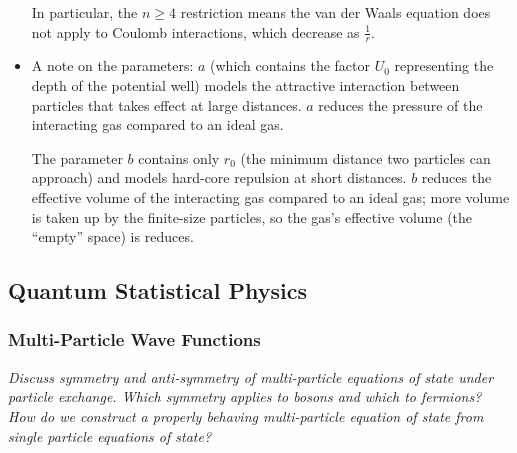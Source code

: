 \documentclass[11pt, a4paper]{article}
\begin{document}
\begin{itemize}
	In particular, the $ n \geq 4 $ restriction means the van der Waals equation does not apply to Coulomb interactions, which decrease as $ \frac{1}{r} $.
	
	\item A note on the parameters: $ a $ (which contains the factor $ U_{0} $ representing the depth of the potential well) models the attractive interaction between particles that takes effect at large distances. $ a $ reduces the pressure of the interacting gas compared to an ideal gas.
	
	The parameter $ b $ contains only $ r_{0} $ (the minimum distance two particles can approach) and models hard-core repulsion at short distances. $ b $ reduces the effective volume of the interacting gas compared to an ideal gas; more volume is taken up by the finite-size particles, so the gas's effective volume (the ``empty'' space) is reduces. 
	\fi

\end{itemize}



\subsection{Quantum Statistical Physics}



\subsubsection{Multi-Particle Wave Functions}
\textit{Discuss symmetry and anti-symmetry of multi-particle equations of state under particle exchange. Which symmetry applies to bosons and which to fermions? How do we construct a properly behaving multi-particle equation of state from single particle equations of state?}
\end{document}
